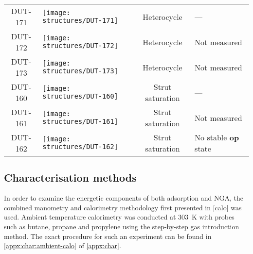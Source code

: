 \begin{table}[p]
\begin{tabular}{c >{\centering}m{6cm} c p{4cm}}
            DUT-171  & 
            \texttt{[image: structures/DUT-171]}
            & Heterocycle & --- \\
            DUT-172  & 
            \texttt{[image: structures/DUT-172]}
            & Heterocycle & Not measured \\
            DUT-173  & 
            \texttt{[image: structures/DUT-173]}
            & Heterocycle & Not measured \\
        \midrule
        DUT-160  & 
            \texttt{[image: structures/DUT-160]}
            & Strut saturation & --- \\
        DUT-161  & 
            \texttt{[image: structures/DUT-161]}
            & Strut saturation & Not measured \\
        DUT-162  & 
            \texttt{[image: structures/DUT-162]}
            & Strut saturation & No stable \textbf{op} state \\
        \bottomrule
	\end{tabular}%
	\label{dut:tab:materials}
\end{table}%

\subsection{Characterisation methods}

In order to examine the energetic components of both adsorption and 
NGA, the combined manometry and calorimetry methodology first 
presented in \autoref{calo} was used. Ambient temperature calorimetry
was conducted at \SI{303}{\kelvin} with probes such as butane, propane
and propylene using the step-by-step gas introduction method. 
The exact procedure for such an experiment can be found in 
\autoref{appx:char:ambient-calo} of \autoref{appx:char}.

